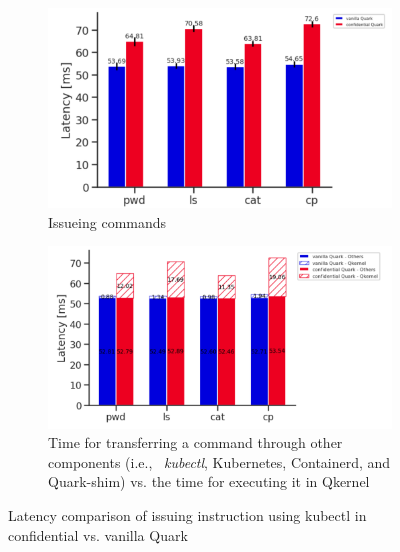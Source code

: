 \begin{figure}[!htb] 
    \begin{subfigure}[b]{0.5\linewidth}
      \centering
      \includegraphics[width=1\textwidth]{images/speed_of_issuing_cmd_in_cquark_upstream_quark.PNG} %
      \caption{Issueing commands}
      \label{fig:speed_of_issuing_cmd_in_cquark_upstream_quark}
      \vspace{4ex}
    \end{subfigure}%
    \begin{subfigure}[b]{0.5\linewidth}
      \centering
      \includegraphics[width=1\textwidth]{images/timeshare_issuing_cmd_in_cquark_upstream_quark_kubectl.png} %
        \caption{Time for transferring a command through other components (i.e., ~\emph{kubectl}, Kubernetes, Containerd, and Quark-shim) vs. the time for executing it in Qkernel}
        \label{fig:timeshare_issuing_cmd_in_cquark_upstream_quark_kubectl}
      \vspace{4ex}
    \end{subfigure} 
    \caption{Latency comparison of issuing instruction using kubectl in confidential vs. vanilla Quark}
    \label{fig8} 
\end{figure}


